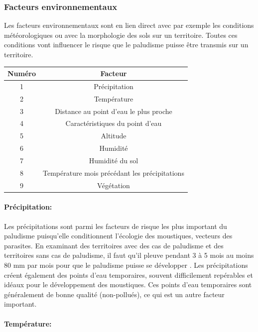 \newpage
\subsubsection{Facteurs environnementaux}
Les facteurs environnementaux sont en lien direct avec par exemple les conditions météorologiques ou avec la morphologie des sols sur un territoire. Toutes ces conditions vont influencer le risque que le paludisme puisse être transmis sur un territoire. \\

\begin{center}
\begin{tabular}{|c|c|} 
\hline
\textbf{Numéro} & \textbf{Facteur}\\
\hline
1 & Précipitation\\
\hline
2 & Température\\
\hline
3 & Distance au point d'eau le plus proche\\
\hline
4 & Caractéristiques du point d'eau\\
\hline
5 & Altitude\\
\hline
6 & Humidité\\
\hline
7 & Humidité du sol \\
\hline
8 & Température mois précédant les précipitations\\
\hline
9 & Végétation\\
\hline
\end{tabular}
\end{center}


\paragraph{Précipitation:}
Les précipitations sont parmi les facteurs de risque les plus important du paludisme puisqu'elle conditionnent l'écologie des moustiques, vecteurs des parasites. En examinant des territoires avec des cas de paludisme et des territoires sans cas de paludisme, il faut qu'il pleuve pendant 3 à 5 mois au moins 80 mm par mois pour que le paludisme puisse se développer \citep{Adjuik1998}. Les précipitations créent également des points d'eau temporaires, souvent difficilement repérables et idéaux pour le développement des moustiques. Ces points d'eau temporaires sont généralement de bonne qualité (non-pollués), ce qui est un autre facteur important.

\paragraph{Température:}

